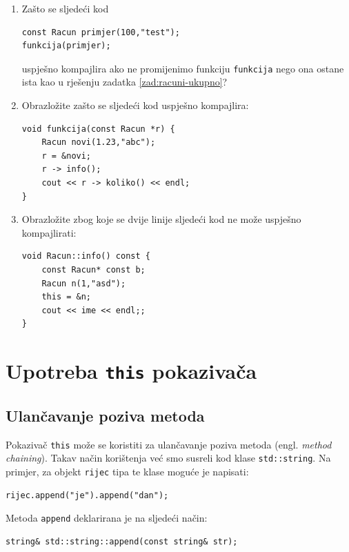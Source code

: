 \begin{razmisljanje}
    \begin{enumerate}
        \item 
        Zašto se sljedeći kod
        \begin{verbatim}
const Racun primjer(100,"test");
funkcija(primjer);
        \end{verbatim}
        uspješno kompajlira ako ne promijenimo funkciju \texttt{funkcija}
        nego ona ostane ista kao u rješenju zadatka \ref{zad:racuni-ukupno}? 
        \item 
        Obrazložite zašto se sljedeći kod uspješno kompajlira:
        \begin{verbatim}
void funkcija(const Racun *r) {
    Racun novi(1.23,"abc");
    r = &novi;
    r -> info();
    cout << r -> koliko() << endl;
}
    \end{verbatim}

    \item 
    Obrazložite zbog koje se dvije linije sljedeći kod ne može uspješno kompajlirati:
    \begin{verbatim}
void Racun::info() const {
    const Racun* const b;
    Racun n(1,"asd");
    this = &n;
    cout << ime << endl;;
}
\end{verbatim}
    \end{enumerate}
\end{razmisljanje}


\section{Upotreba \texttt{this} pokazivača}


\subsection{Ulančavanje poziva metoda}

Pokazivač \texttt{this} može se koristiti za ulančavanje poziva metoda (engl. \emph{method chaining}). Takav način korištenja već smo susreli kod klase \texttt{std::string}. Na primjer, za objekt \texttt{rijec} tipa te klase moguće je napisati:

\begin{verbatim}
rijec.append("je").append("dan");
\end{verbatim}

Metoda \texttt{append} deklarirana je na sljedeći način:

\begin{verbatim}
string& std::string::append(const string& str);
\end{verbatim}

